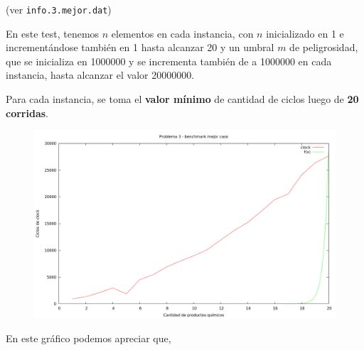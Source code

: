 (ver \verb|info.3.mejor.dat|) \medskip

En este test, tenemos $n$ elementos en cada instancia, con $n$ inicializado en 1 e incrementándose
también en 1 hasta alcanzar 20 y un umbral $m$ de peligrosidad, que se inicializa en 1000000 y se incrementa
también de a 1000000 en cada instancia, hasta alcanzar el valor 20000000.

Para cada instancia, se toma el \textbf{valor mínimo} de cantidad de ciclos luego de \textbf{20 corridas}.


\begin{figure}[h]
  \begin{center}
    \includegraphics[scale=0.35]{imagenes/grafico-3-mejor.png}
  \end{center}
\end{figure}


En este gráfico podemos apreciar que,
